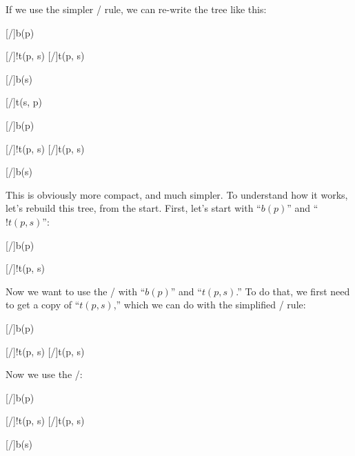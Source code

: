 \documentclass[../../../main.tex]{subfiles}
\begin{document}
\noindent
If we use the simpler \bangCopy/ rule, we can re-write the tree like this:

\begin{prooftree*}
  \hypo{}
  [\startrule/]{b(p)}
  
  \hypo{}
  [\startrule/]{!t(p, s)}
  [\bangCopy/]{t(p, s)}
  
  [\traderule/]{b(s)}
  
  \hypo{}
  [\startrule/]{t(s, p)}
  
  [\traderule/]{b(p)}

  \hypo{}
  [\startrule/]{!t(p, s)}
  [\bangCopy/]{t(p, s)}

  [\traderule/]{b(s)}

\end{prooftree*}

\noindent
This is obviously more compact, and much simpler. To understand how it works, let's rebuild this tree, from the start. First, let's start with ``$b(p)$'' and ``$!t(p, s)$'':

\begin{prooftree*}
  \hypo{}
  [\startrule/]{b(p)}
  
  \hypo{}
  [\startrule/]{!t(p, s)}
  

\end{prooftree*}

\noindent
Now we want to use the \traderule/ with ``$b(p)$'' and ``$t(p, s)$.'' To do that, we first need to get a copy of ``$t(p, s)$,'' which we can do with the simplified \bangCopy/ rule:

\begin{prooftree*}
  \hypo{}
  [\startrule/]{b(p)}
  
  \hypo{}
  [\startrule/]{!t(p, s)}
  [\bangCopy/]{t(p, s)}
  

\end{prooftree*}

\noindent
Now we use the \traderule/:

\begin{prooftree*}
  \hypo{}
  [\startrule/]{b(p)}
  
  \hypo{}
  [\startrule/]{!t(p, s)}
  [\bangCopy/]{t(p, s)}
  
  [\traderule/]{b(s)}

\end{prooftree*}
 
\end{document}
